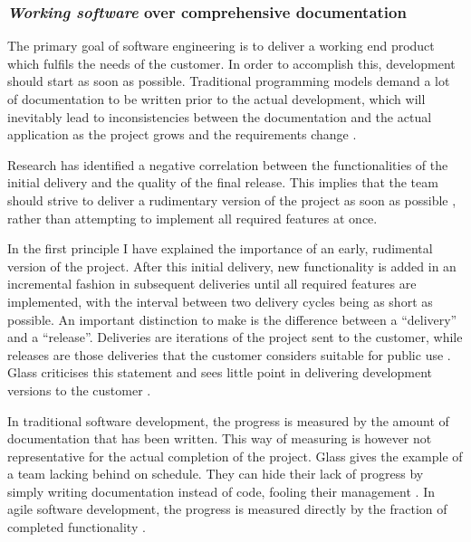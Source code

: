 \subsubsection{\emph{Working software} over comprehensive documentation}
The primary goal of software engineering is to deliver a working end product which fulfils the needs of the customer. In order to accomplish this, development should start as soon as possible. Traditional programming models demand a lot of documentation to be written prior to the actual development, which will inevitably lead to inconsistencies between the documentation and the actual application as the project grows and the requirements change \cite{Hazzan2014}. 
	
Research has identified a negative correlation between the functionalities of the initial delivery and the quality of the final release. This implies that the team should strive to deliver a rudimentary version of the project as soon as possible \cite{martin2014}, rather than attempting to implement all required features at once.

In the first principle I have explained the importance of an early, rudimental version of the project. After this initial delivery, new functionality is added in an incremental fashion in subsequent deliveries until all required features are implemented, with the interval between two delivery cycles being as short as possible. An important distinction to make is the difference between a ``delivery'' and a ``release''. Deliveries are iterations of the project sent to the customer, while releases are those deliveries that the customer considers suitable for public use  \cite{fowlerhighsmithagile}. Glass criticises this statement and sees little point in delivering development versions to the customer \cite{glass2001agile}.

In traditional software development, the progress is measured by the amount of documentation that has been written. This way of measuring is however not representative for the actual completion of the project. Glass gives the example of a team lacking behind on schedule. They can hide their lack of progress by simply writing documentation instead of code, fooling their management \cite{glass2001agile}. In agile software development, the progress is measured directly by the fraction of completed functionality \cite{martin2014}.


